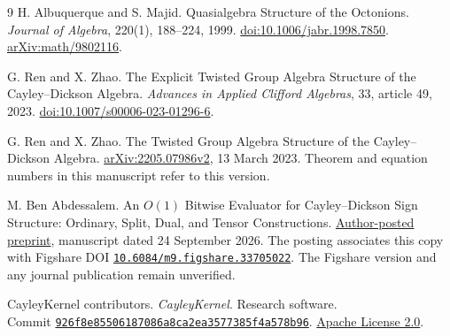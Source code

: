 \documentclass[11pt]{article}
\begin{document}
\begin{thebibliography}{9}
H. Albuquerque and S. Majid.
Quasialgebra Structure of the Octonions.
\emph{Journal of Algebra}, 220(1), 188--224, 1999.
\href{https://doi.org/10.1006/jabr.1998.7850}{doi:10.1006/jabr.1998.7850}.
\href{https://arxiv.org/abs/math/9802116}{arXiv:math/9802116}.

G. Ren and X. Zhao.
The Explicit Twisted Group Algebra Structure of the Cayley--Dickson Algebra.
\emph{Advances in Applied Clifford Algebras}, 33, article 49, 2023.
\href{https://doi.org/10.1007/s00006-023-01296-6}{doi:10.1007/s00006-023-01296-6}.

G. Ren and X. Zhao.
The Twisted Group Algebra Structure of the Cayley--Dickson Algebra.
\href{https://arxiv.org/html/2205.07986v2}{arXiv:2205.07986v2},
13 March 2023. Theorem and equation numbers in this manuscript
refer to this version.

M. Ben Abdessalem.
An \(O(1)\) Bitwise Evaluator for Cayley--Dickson Sign Structure:
Ordinary, Split, Dual, and Tensor Constructions.
\href{https://www.academia.edu/179628334/An_O_1_Bitwise_Evaluator_for_Cayley_Dickson_Sign_Structure_Ordinary_Split_Dual_and_Tensor_Constructions}{Author-posted preprint}, manuscript dated 24 September 2026.
The posting associates this copy with Figshare DOI
\href{https://doi.org/10.6084/m9.figshare.33705022}{\nolinkurl{10.6084/m9.figshare.33705022}}.
The Figshare version and any journal publication remain unverified.

CayleyKernel contributors. \emph{CayleyKernel}. Research software.\\
Commit \href{https://github.com/alikaperdue/CayleyKernel/tree/926f8e85506187086a8ca2ea3577385f4a578b96}
{\nolinkurl{926f8e85506187086a8ca2ea3577385f4a578b96}}.
\href{https://github.com/alikaperdue/CayleyKernel/blob/926f8e85506187086a8ca2ea3577385f4a578b96/LICENSE}{Apache License 2.0}.
\end{thebibliography}
\end{document}
